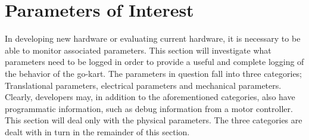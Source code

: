 
\section{Parameters of Interest}
\label{sec:parameters}
In developing new hardware or evaluating current hardware, it is necessary to be able to monitor associated parameters.
This section will investigate what parameters need to be logged in order to provide a useful and complete logging of the behavior of the go-kart.
The parameters in question fall into three categories; Translational parameters, electrical parameters and mechanical parameters.
Clearly, developers may, in addition to the aforementioned categories, also have programmatic information, such as debug information from a motor controller.
This section will deal only with the physical parameters.
The three categories are dealt with in turn in the remainder of this section.
